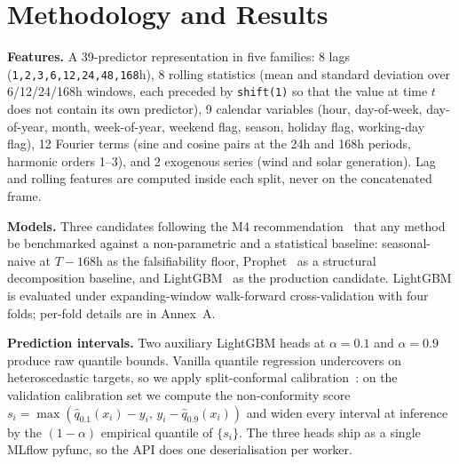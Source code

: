 \documentclass[11pt,a4paper]{article}
\newcommand{\code}[1]{\texttt{\small #1}}
\begin{document}
\section{Methodology and Results}

\textbf{Features.} A 39-predictor representation in five families: 8 lags (\code{1,2,3,6,12,24,48,168}h), 8 rolling statistics (mean and standard deviation over 6/12/24/168h windows, each preceded by \code{shift(1)} so that the value at time $t$ does not contain its own predictor), 9 calendar variables (hour, day-of-week, day-of-year, month, week-of-year, weekend flag, season, holiday flag, working-day flag), 12 Fourier terms (sine and cosine pairs at the 24h and 168h periods, harmonic orders 1--3), and 2 exogenous series (wind and solar generation). Lag and rolling features are computed inside each split, never on the concatenated frame.

\textbf{Models.} Three candidates following the M4 recommendation~\cite{makridakis2020m4} that any method be benchmarked against a non-parametric and a statistical baseline: seasonal-naive at $T{-}168$h as the falsifiability floor, Prophet~\cite{taylor2018prophet} as a structural decomposition baseline, and LightGBM~\cite{ke2017lightgbm} as the production candidate. LightGBM is evaluated under expanding-window walk-forward cross-validation with four folds; per-fold details are in Annex~A.

\textbf{Prediction intervals.} Two auxiliary LightGBM heads at $\alpha = 0.1$ and $\alpha = 0.9$ produce raw quantile bounds. Vanilla quantile regression undercovers on heteroscedastic targets, so we apply split-conformal calibration~\cite{romano2019cqr, angelopoulos2021gentle}: on the validation calibration set we compute the non-conformity score $s_i = \max(\hat{q}_{0.1}(x_i) - y_i,\, y_i - \hat{q}_{0.9}(x_i))$ and widen every interval at inference by the $(1-\alpha)$ empirical quantile of $\{s_i\}$. The three heads ship as a single MLflow pyfunc, so the API does one deserialisation per worker.
\end{document}
